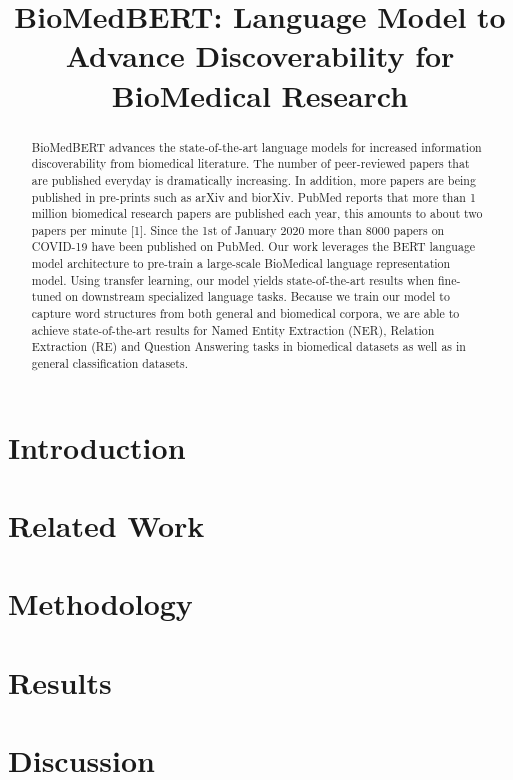 \documentclass{article}
\title{BioMedBERT: Language Model to Advance Discoverability for BioMedical Research}
\author{
}
\begin{document}
\maketitle
\begin{abstract}
BioMedBERT advances the state-of-the-art language models for increased information discoverability from biomedical literature. The number of peer-reviewed papers that are published everyday is dramatically increasing. In addition, more papers are being published in pre-prints such as arXiv and biorXiv. PubMed reports that more than 1 million biomedical research papers are published each year, this amounts to about two papers per minute [1]. Since the 1st of January 2020 more than 8000 papers on COVID-19 have been published on PubMed. Our work leverages the BERT language model architecture to pre-train a large-scale BioMedical language representation model. Using transfer learning, our model yields state-of-the-art results when fine-tuned on downstream specialized language tasks. Because we train our model to capture word structures from both general and biomedical corpora, we are able to achieve state-of-the-art results for Named Entity Extraction (NER), Relation Extraction (RE) and Question Answering tasks in biomedical datasets as well as in general classification datasets. 
\end{abstract}




\section{Introduction}



\section{Related Work}


\section{Methodology}


\section{Results}


\section{Discussion}
\end{document}
